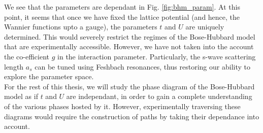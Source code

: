We see that the parameters are dependant in Fig. \ref{fig:bhm_param}. At this point, it seems that once we have fixed the lattice potential (and hence, the Wannier functions upto a gauge), the parameters $t$ and $U$ are uniquely determined. This would severely restrict the regimes of the Bose-Hubbard model that are experimentally accessible. However, we have not taken into the account the co-efficient $g$ in the interaction parameter. Particularly, the s-wave scattering length $a_s$ can be tuned using Feshbach resonances\cite{Chin_2010}, thus restoring our ability to explore the parameter space. 
\vspace{0.5cm}\\
For the rest of this thesis, we will study the phase diagram of the Bose-Hubbard model as if $t$ and $U$ are independant, in order to gain a complete understanding of the various phases hosted by it. However, experimentally traversing these diagrams would require the construction of paths by taking their dependance into account.
